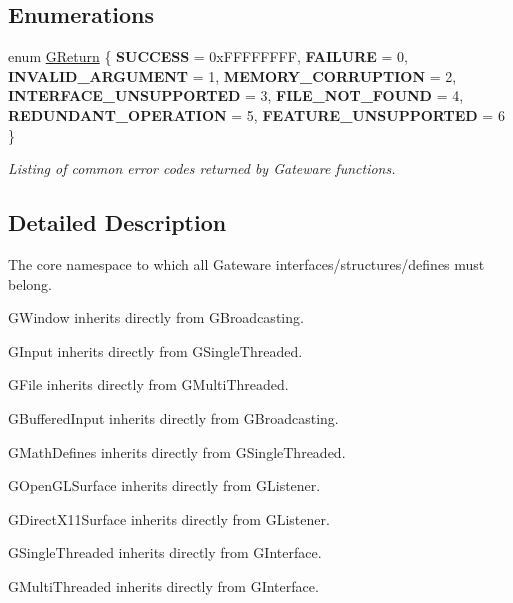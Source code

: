 \subsection*{Enumerations}
\begin{DoxyCompactItemize}
\item 
\mbox{\label{namespaceGW_a67a839e3df7ea8a5c5686613a7a3de21}} 
enum \mbox{\hyperlink{namespaceGW_a67a839e3df7ea8a5c5686613a7a3de21}{G\+Return}} \{ \newline
{\bfseries S\+U\+C\+C\+E\+SS} = 0x\+F\+F\+F\+F\+F\+F\+FF, 
{\bfseries F\+A\+I\+L\+U\+RE} = 0, 
{\bfseries I\+N\+V\+A\+L\+I\+D\+\_\+\+A\+R\+G\+U\+M\+E\+NT} = 1, 
{\bfseries M\+E\+M\+O\+R\+Y\+\_\+\+C\+O\+R\+R\+U\+P\+T\+I\+ON} = 2, 
\newline
{\bfseries I\+N\+T\+E\+R\+F\+A\+C\+E\+\_\+\+U\+N\+S\+U\+P\+P\+O\+R\+T\+ED} = 3, 
{\bfseries F\+I\+L\+E\+\_\+\+N\+O\+T\+\_\+\+F\+O\+U\+ND} = 4, 
{\bfseries R\+E\+D\+U\+N\+D\+A\+N\+T\+\_\+\+O\+P\+E\+R\+A\+T\+I\+ON} = 5, 
{\bfseries F\+E\+A\+T\+U\+R\+E\+\_\+\+U\+N\+S\+U\+P\+P\+O\+R\+T\+ED} = 6
 \}
\begin{DoxyCompactList}\small\item\em Listing of common error codes returned by Gateware functions. \end{DoxyCompactList}\end{DoxyCompactItemize}


\subsection{Detailed Description}
The core namespace to which all Gateware interfaces/structures/defines must belong. 

G\+Window inherits directly from G\+Broadcasting.

G\+Input inherits directly from G\+Single\+Threaded.

G\+File inherits directly from G\+Multi\+Threaded.

G\+Buffered\+Input inherits directly from G\+Broadcasting.

G\+Math\+Defines inherits directly from G\+Single\+Threaded.

G\+Open\+G\+L\+Surface inherits directly from G\+Listener.

G\+Direct\+X11\+Surface inherits directly from G\+Listener.

G\+Single\+Threaded inherits directly from G\+Interface.

G\+Multi\+Threaded inherits directly from G\+Interface.

